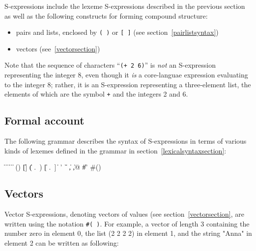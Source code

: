 S-expressions include the lexeme S-expressions described in the
previous section as well as the following constructs for forming
compound structure:
%
\begin{itemize}
\item pairs and lists, enclosed by \verb|( )| or \verb|[ ]| (see
  section~\ref{pairlistsyntax})
\item  vectors (see~\ref{vectorsection})
\end{itemize}

Note that the sequence of characters ``{\tt(+ 2 6)}'' is {\em not} an
S-expression representing the integer 8, even though it {\em is} a
core-languae expression evaluating to the integer 8; rather, it is an
S-expression representing a three-element list, the elements of which
are the symbol {\tt +} and the integers 2 and 6.

\subsection{Formal account}
\label{datumsyntax}

The following grammar describes the syntax of S-expressions in terms
of various kinds of lexemes defined in the grammar in
section~\ref{lexicalsyntaxsection}:

\begin{grammar}%
 \: 
\>  \| 
 \:  \| 
\>  \|  \|  \|  
 \: 
 \:  \| 
 \: ()
\>    \| []
\>    \| ( .\ )
\>    \| [ .\ ]
\>    \| 
 \:  
 \: ' \| ` \| , \| ,@ \| \#'
 \: \#() %
\end{grammar}

\subsection{Vectors}
\label{vectorsyntax}

Vector S-expressions, denoting vectors of values (see
section~\ref{vectorsection}, are written using the notation
{\tt\#( \dotsfoo)}.  For example, a vector of length 3
containing the number zero in element 0, the list {\cf(2 2 2 2)} in
element 1, and the string {\cf "Anna"} in element 2 can be written as
following:

